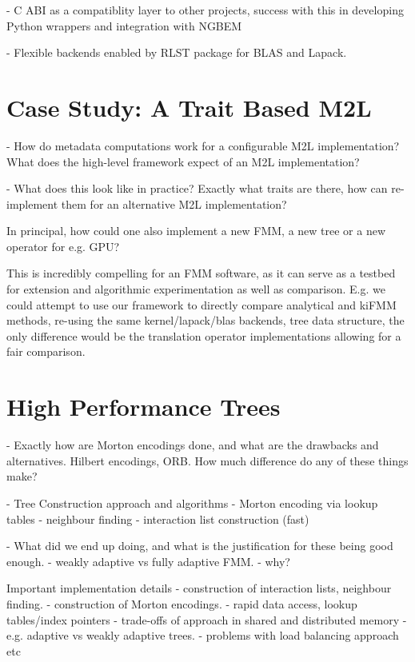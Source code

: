 - C ABI as a compatiblity layer to other projects, success with this in developing Python wrappers and integration with NGBEM

- Flexible backends enabled by RLST package for BLAS and Lapack.

\section{Case Study: A Trait Based M2L}

- How do metadata computations work for a configurable M2L implementation? What does the high-level framework expect of an M2L implementation?

- What does this look like in practice? Exactly what traits are there, how can re-implement them for an alternative M2L implementation?


In principal, how could one also implement a new FMM, a new tree or a new operator for e.g. GPU?

This is incredibly compelling for an FMM software, as it can serve as a testbed for extension and algorithmic experimentation as well as comparison. E.g. we could attempt to use our framework to directly compare analytical and kiFMM methods, re-using the same kernel/lapack/blas backends, tree data structure, the only difference would be the translation operator implementations allowing for a fair comparison.

\section{High Performance Trees}

- Exactly how are Morton encodings done, and what are the drawbacks and alternatives. Hilbert encodings, ORB. How much difference do any of these things make?

- Tree Construction approach and algorithms
    - Morton encoding via lookup tables
    - neighbour finding
    - interaction list construction (fast)

- What did we end up doing, and what is the justification for these being good enough.
    - weakly adaptive vs fully adaptive FMM.
    - why?


Important implementation details
    - construction of interaction lists, neighbour finding.
    - construction of Morton encodings.
    - rapid data access, lookup tables/index pointers
    - trade-offs of approach in shared and distributed memory
        - e.g. adaptive vs weakly adaptive trees.
        - problems with load balancing approach etc

